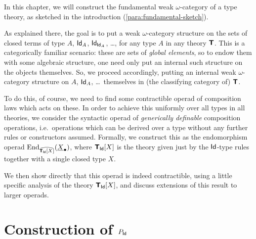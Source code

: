 
\newcommand{\idelim}[5]{\Jterm_(#2;\,#3,#4,#5)}

\newcommand{\miniqed}{$\diamond$}

\newcommand{\doubleqed}{$\diamond$}






In this chapter, we will construct the fundamental weak $\omega$-category of a type theory, as sketched in the introduction (\ref{para:fundamental-sketch}).

As explained there, the goal is to put a weak $\omega$-category structure on the sets of closed terms of type $A$, $\mathsf{Id}_A$, $\mathsf{Id}_{\mathsf{Id}_A}$, \ldots, for any type $A$ in any theory $\textbf{\textsf{T}}$.  This is a categorically familiar scenario: these are sets of \emph{global elements}, so to endow them with some algebraic structure, one need only put an internal such structure on the objects themselves.  So, we proceed accordingly, putting an internal weak $\omega$-category structure on $A$, $\mathsf{Id}_A$, \ldots\ themselves in (the classifying category of) $\textbf{\textsf{T}}$.

To do this, of course, we need to find some contractible operad of composition laws which acts on these.  In order to achieve this uniformly over all types in all theories, we consider the syntactic operad of \emph{generically definable} composition operations, i.e.\ operations which can be derived over a type without any further rules or constructors assumed.  Formally, we construct this as the endomorphism operad $\mathrm{End}_{\widehat{\textbf{\textsf{T}}_{\mathsf{Id}} [X]}}(\underline{X}_\bullet)$, where $\textbf{\textsf{T}}_{\mathsf{Id}} [X]$ is the theory given just by the $\mathsf{Id}$-type rules together with a single closed type $X$.

We then show directly that this operad is indeed contractible, using a little specific analysis of the theory $\textbf{\textsf{T}}_{\mathsf{Id}}[X]$, and discuss extensions of this result to larger operads.

\section{Construction of \texorpdfstring{$P_{\mathsf{Id}}$}{P\_Id}}

